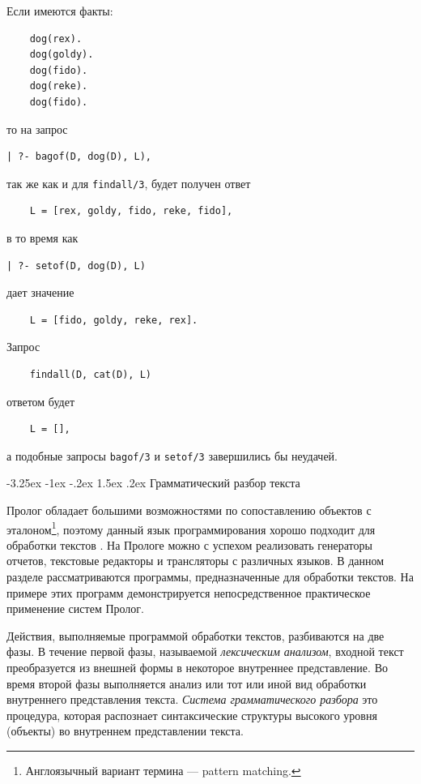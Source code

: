 \documentclass[12pt, openany, twoside]{book} %
\makeatletter
\renewcommand\section{\@startsection {section}{1}{\z@}%
                                   {-3.25ex \@plus -1ex \@minus -.2ex}%
                                   {1.5ex \@plus.2ex}%
                                   {\normalfont\large\bfseries}}
\makeatother
\begin{document}
Если имеются факты:

{\tt\begin{verbatim}
    dog(rex).
    dog(goldy).
    dog(fido).
    dog(reke).
    dog(fido).
\end{verbatim}}

\noindent то на запрос

{\tt\begin{verbatim}
| ?- bagof(D, dog(D), L),
\end{verbatim}}

\noindent так же как и для {\tt findall/3}, будет получен ответ
{\tt\begin{verbatim}
    L = [rex, goldy, fido, reke, fido],
\end{verbatim}}

\noindent в то время как

{\tt\begin{verbatim}
| ?- setof(D, dog(D), L)
\end{verbatim}}

\noindent дает значение
{\tt\begin{verbatim}
    L = [fido, goldy, reke, rex].
\end{verbatim}}

\noindent Запрос
{\tt\begin{verbatim}
    findall(D, cat(D), L)
\end{verbatim}}

\noindent ответом будет
{\tt\begin{verbatim}
    L = [],
\end{verbatim}}
\noindent а подобные запросы {\tt bagof/3} и {\tt setof/3} завершились бы неудачей.

\section{Грамматический разбор текста}

Пролог обладает большими возможностями по сопоставлению объектов с эталоном\footnote{Англоязычный вариант термина --- pattern matching.}, поэтому данный язык программирования хорошо подходит для обработки текстов \cite{Malpas}. На Прологе можно с успехом реализовать генераторы отчетов, текстовые редакторы и трансляторы с различных языков. В данном разделе рассматриваются программы, предназначенные для обработки текстов. На примере этих программ демонстрируется непосредственное практическое применение систем Пролог.

Действия, выполняемые программой обработки текстов, разбиваются на две фазы. В течение первой фазы, называемой \emph{лексическим анализом}, входной текст преобразуется из внешней формы в некоторое внутреннее представление. Во время второй фазы выполняется анализ или тот или иной вид обработки внутреннего представления текста. \emph{Система грамматического разбора} это процедура, которая распознает синтаксические структуры высокого уровня (объекты) во внутреннем представлении текста.
\end{document}
